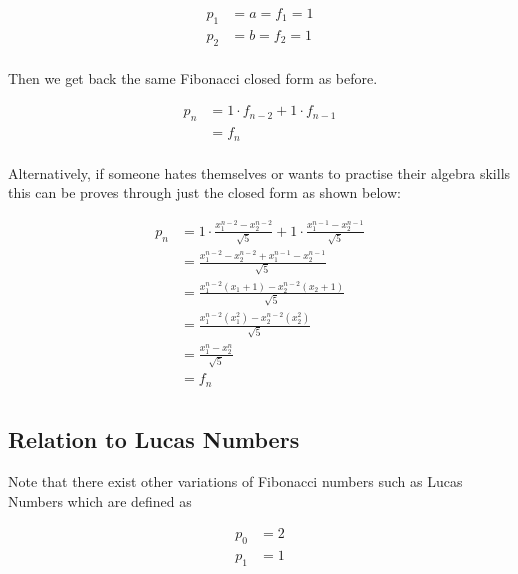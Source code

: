 \documentclass[a4paper]{article}
\begin{document}
\begin{equation*}
\begin{aligned}
p_1 &= a= f_1 = 1  \\
p_2 &= b= f_2 = 1  \\
\end{aligned}
\end{equation*}

Then we get back the same Fibonacci closed form as before.

\begin{equation}
\begin{split}
p_n &= 1 \cdot f_{n-2} + 1 \cdot f_{n-1} \\
&= f_n  \\
\end{split}\label{eq:equation5}
\end{equation}

Alternatively, if someone hates themselves or wants to practise their algebra skills this can be proves through just the closed form as shown below:

\begin{equation*}
\begin{split}
p_n &= 1 \cdot \frac{x_1^{n-2} - x_2^{n-2}}{\sqrt{5}} + 1 \cdot \frac{x_1^{n-1} - x_2^{n-1}}{\sqrt{5}} \\
&= \frac{x_1^{n-2} - x_2^{n-2} + x_1^{n-1} - x_2^{n-1} }{\sqrt{5}} \\
&= \frac{x_1^{n-2}(x_1 + 1) - x_2^{n-2}(x_2 + 1) }{\sqrt{5}} \\
&= \frac{x_1^{n-2}(x_1^2) - x_2^{n-2}(x_2^2) }{\sqrt{5}} \\
&= \frac{x_1^{n}- x_2^{n}}{\sqrt{5}} \\
&= f_n \\
\end{split}
\end{equation*}

\subsection{Relation to Lucas Numbers}\label{subsec:relation-to-lucas-numbers}
Note that there exist other variations of Fibonacci numbers such as Lucas Numbers which are defined as

\begin{equation}
\begin{aligned}
p_0 &= 2  \\
p_1 &= 1  \\
\end{aligned}\label{eq:equation6}
\end{equation}
\end{document}
